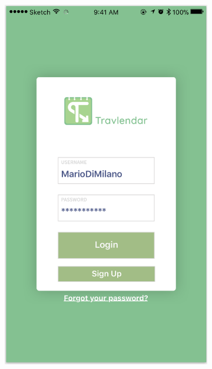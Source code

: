 \documentclass[12pt]{article}
\begin{document}
\begin{figure}[H]
\centering
    \begin{subfigure}{.4\textwidth}
        \includegraphics[scale=0.47]{interfaceLogin.png}
        \label{fig:loginScreen}
    \end{subfigure}%
    \begin{subfigure}{.4\textwidth}

\end{subfigure}
\end{figure}
\end{document}

